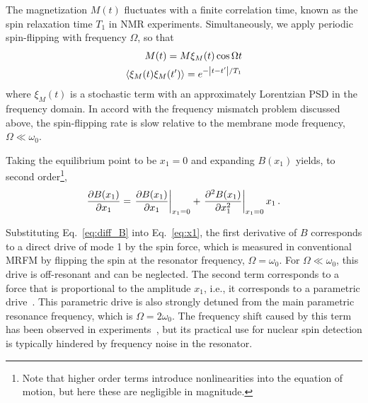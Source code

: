 The magnetization $M(t)$ fluctuates with a finite correlation time, known as the spin relaxation time $T_1$ in NMR experiments. Simultaneously, we apply periodic spin-flipping with frequency $\Omega$, so that
\begin{align} \label{eq:M(t)}
M(t) = M \xi_M(t) \cos{\Omega t} \\\expval{\xi_M(t) \xi_M(t')} = e^{- \abs{t-t'} / T_1}
\end{align}
where $\xi_M(t)$ is a stochastic term with an approximately Lorentzian PSD in the frequency domain. In accord with the frequency mismatch problem discussed above, the spin-flipping rate is slow relative to the membrane mode frequency, $\Omega \ll \omega_0$.

Taking the equilibrium point to be $x_1 = 0$ and expanding $B(x_1)$ yields, to second order\footnote{Note that higher order terms introduce nonlinearities into the equation of motion, but here these are negligible in magnitude.},
\begin{equation} \label{eq:diff_B}
\frac{\partial  B(x_1)}{\partial x_1} = \eval{\frac{\partial  B(x_1)}{\partial x_1}}_{x_1 = 0} + \eval{\frac{\partial^2 B(x_1)}{\partial x_1^2}}_{x_1 = 0} x_1 \,.
\end{equation}

Substituting Eq.~\eqref{eq:diff_B} into Eq.~\eqref{eq:x1}, the first derivative of $B$ corresponds to a direct drive of mode 1 by the spin force, which is measured in conventional MRFM by flipping the spin at the resonator frequency, $\Omega = \omega_0$. For $\Omega \ll \omega_0$, this drive is off-resonant and can be neglected. The second term corresponds to a force that is proportional to the amplitude $x_1$, i.e., it corresponds to a parametric drive~\cite{Rugar_1991, Lifshitz_2008, Leuch_2016}. This parametric drive is also strongly detuned from the main parametric resonance frequency, which is $\Omega = 2 \omega_0$. The frequency shift caused by this term has been observed in experiments~\cite{Rugar_2004, Garner_2004, Degen_2009, Lee_2012}, but its practical use for nuclear spin detection is typically hindered by frequency noise in the resonator. 
\\

